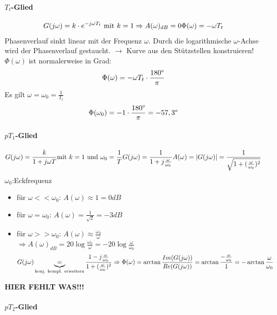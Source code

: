 \documentclass[12pt,a4paper,ngerman]{scrartcl}
\begin{document}
\paragraph{$T_t$-Glied}

\[
G(j\omega)=k\cdot e^{-j\omega T_t} \text{ mit }k=1\\
\Rightarrow A(\omega)_{dB}=0\\
\Phi(\omega)=-\omega T_t
\]
Phasenverlauf sinkt linear mit der Frequenz $\omega$. Durch die logarithmische $\omega$-Achse wird der Phasenverlauf gestaucht. $\rightarrow$ Kurve aus den Stützstellen konstruieren! \\
$\Phi(\omega)$ ist normalerweise in Grad:
\[
\Phi(\omega)=-\omega T_t\cdot \frac{180\degree}{\pi}
\]
Es gilt $\omega = \omega_0 =\frac{1}{T_t}$
\[
\Phi(\omega_0)=-1\cdot \frac{180\degree}{\pi}=-57,3\degree
\]

\paragraph{$pT_1$-Glied}

\[
G(j\omega)=\frac{k}{1+j\omega T}\\
\text{mit } k=1 \text{ und } \omega_0=\frac{1}{T}\\
G(j\omega)=\frac{1}{1+j\frac{\omega}{\omega_0}}\\
A(\omega)=|G(j\omega)|=\frac{1}{\sqrt{1+(\frac{\omega}{\omega_0})^2}}
\]
$\omega_0$:Eckfrequenz
\begin{itemize}
\item für $\omega << \omega_0$: $A(\omega)\approx 1 =0dB$
\item für $\omega=\omega_0$: $A(\omega)=\frac{1}{\sqrt{2}}= -3dB$
\item für $\omega >>\omega_0$: $A(\omega)\approx \frac{\omega_0}{\omega}$\\
  $\Rightarrow A(\omega)_{dB}=20\log{\frac{\omega_0}{\omega}}=-20\log{\frac{\omega}{\omega_0}}$
\[
G(j\omega)\underbrace{=}_{\text{konj. kompl. erweitern}} \frac{1-j\frac{\omega}{\omega_0}}{1+(\frac{\omega}{\omega_0})^2}\\
\Rightarrow \Phi(\omega)=\arctan{\frac{Im(G(j\omega))}{Re(G(j\omega))}}\\
 =\arctan{\frac{-\frac{\omega}{\omega_0}}{1}}=-\arctan{\frac{\omega}{\omega_0}}
\]
\end{itemize}
\textbf{HIER FEHLT WAS!!!}

\paragraph{$pT_2$-Glied}
\end{document}
